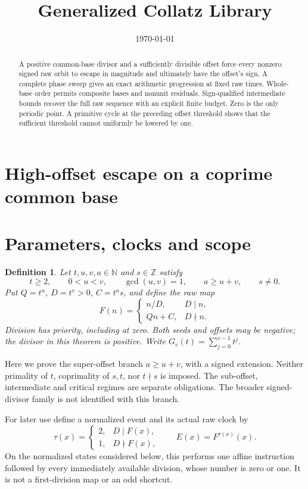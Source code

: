 \documentclass[11pt,letterpaper]{article}
\title{Generalized Collatz Library}
\author{}
\date{\today}
\newcommand{\N}{\mathbb{N}}
\newcommand{\Z}{\mathbb{Z}}
\newtheorem{definition}[theorem]{Definition}
\begin{document}
\maketitle
\section*{High-offset escape on a coprime common base}

\begin{abstract}
A positive common-base divisor and a sufficiently divisible offset force every
nonzero signed raw orbit to escape in magnitude and ultimately have the
offset's sign. A complete phase sweep gives an exact arithmetic progression at
fixed raw times. Whole-base order permits composite bases and nonunit
residuals. Sign-qualified intermediate bounds recover the full raw sequence
with an explicit finite budget. Zero is the only periodic point. A primitive
cycle at the preceding offset threshold shows that the sufficient threshold
cannot uniformly be lowered by one.
\end{abstract}

\section{Parameters, clocks and scope}

\begin{definition}
Let \(t,u,v,a\in\N\) and \(s\in\Z\) satisfy
\[
t\ge2,\qquad 0<u<v,\qquad \gcd(u,v)=1,\qquad a\ge u+v,\qquad s\ne0.
\]
Put \(Q=t^u\), \(D=t^v>0\), \(C=t^a s\), and define the raw map
\[
F(n)=\begin{cases}n/D,&D\mid n,\\Qn+C,&D\nmid n.\end{cases}
\]
Division has priority, including at zero. Both seeds and offsets may be
negative; the divisor in this theorem is positive.
Write \(G_v(t)=\sum_{j=0}^{v-1}t^j\).
\end{definition}

Here we prove the super-offset branch \(a\ge u+v\),
with a signed extension. Neither primality of \(t\), coprimality of \(s,t\),
nor \(t\nmid s\) is imposed. The sub-offset, intermediate and critical regimes
are separate obligations. The broader signed-divisor family is not identified
with this branch.

For later use define a normalized event and its actual raw clock by
\[
\tau(x)=
\begin{cases}2,&D\mid F(x),\\1,&D\nmid F(x),\end{cases}
\qquad E(x)=F^{\tau(x)}(x).
\]
On the normalized states considered below, this performs one affine instruction
followed by every immediately available division, whose number is zero or one.
It is not a first-division map or an odd shortcut.
\end{document}

